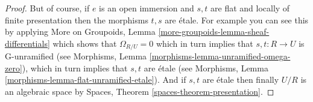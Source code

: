 \documentclass[10pt,a4paper]{amsart}
\theoremstyle{plain}
\theoremstyle{definition}
\theoremstyle{remark}
\numberwithin{equation}{subsection}
\begin{document}
\begin{proof}
\medskip\noindent
But of course, if $e$ is an open immersion and
$s, t$ are flat and locally of finite presentation
then the morphisms $t, s$ are \'etale.
For example you can see this by applying
More on Groupoids, Lemma \ref{more-groupoids-lemma-sheaf-differentials}
which shows that $\Omega_{R/U} = 0$ which in turn implies
that $s, t : R \to U$ is G-unramified (see
Morphisms, Lemma \ref{morphisms-lemma-unramified-omega-zero}),
which in turn implies that $s, t$ are \'etale (see
Morphisms, Lemma \ref{morphisms-lemma-flat-unramified-etale}).
And if $s, t$ are \'etale then finally $U/R$ is an algebraic
space by
Spaces, Theorem \ref{spaces-theorem-presentation}.
\end{proof}
\end{document}
